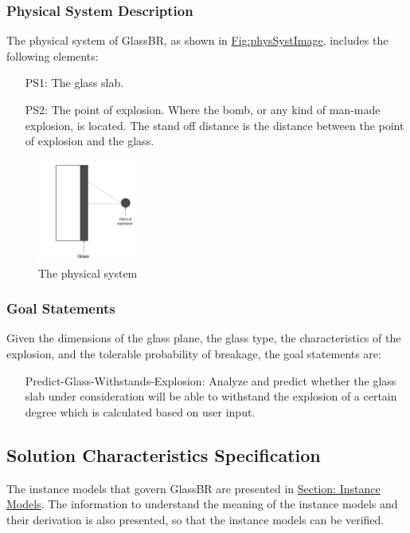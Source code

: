 \documentclass[12pt]{article}
\begin{document}
\subsubsection{Physical System Description}
\label{Sec:PhysSyst}
The physical system of GlassBR, as shown in \hyperref[Figure:physSystImage]{Fig:physSystImage}, includes the following elements:
\begin{itemize}
\item[PS1:]The glass slab.
\item[PS2:]The point of explosion. Where the bomb, or any kind of man-made explosion, is located. The stand off distance is the distance between the point of explosion and the glass.
\end{itemize}
\begin{figure}
\begin{center}
\includegraphics[width=0.3\textwidth]{../../../datafiles/GlassBR/physicalsystimage.png}
\caption{The physical system}
\label{Figure:physSystImage}
\end{center}
\end{figure}
\subsubsection{Goal Statements}
\label{Sec:GoalStmt}
Given the dimensions of the glass plane, the glass type, the characteristics of the explosion, and the tolerable probability of breakage, the goal statements are:
\begin{itemize}
\item[Predict-Glass-Withstands-Explosion:\phantomsection\label{willBreakGS}]Analyze and predict whether the glass slab under consideration will be able to withstand the explosion of a certain degree which is calculated based on user input.
\end{itemize}
\subsection{Solution Characteristics Specification}
\label{Sec:SolCharSpec}
The instance models that govern GlassBR are presented in \hyperref[Sec:IMs]{Section: Instance Models}. The information to understand the meaning of the instance models and their derivation is also presented, so that the instance models can be verified.
\end{document}
